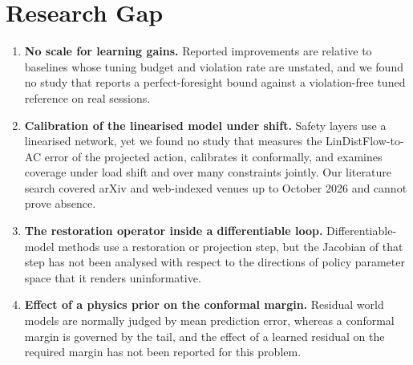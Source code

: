 \documentclass[11pt]{article}
\begin{document}
\section{Research Gap}\label{sec:gap}
\begin{enumerate}
\item \textbf{No scale for learning gains.} Reported improvements are relative to baselines whose tuning budget and violation rate are unstated, and we found no study that reports a perfect-foresight bound against a violation-free tuned reference on real sessions.
\item \textbf{Calibration of the linearised model under shift.} Safety layers use a linearised network, yet we found no study that measures the LinDistFlow-to-AC error of the projected action, calibrates it conformally, and examines coverage under load shift and over many constraints jointly. Our literature search covered arXiv and web-indexed venues up to October 2026 and cannot prove absence.
\item \textbf{The restoration operator inside a differentiable loop.} Differentiable-model methods use a restoration or projection step, but the Jacobian of that step has not been analysed with respect to the directions of policy parameter space that it renders uninformative.
\item \textbf{Effect of a physics prior on the conformal margin.} Residual world models are normally judged by mean prediction error, whereas a conformal margin is governed by the tail, and the effect of a learned residual on the required margin has not been reported for this problem.
\end{enumerate}

\end{document}
